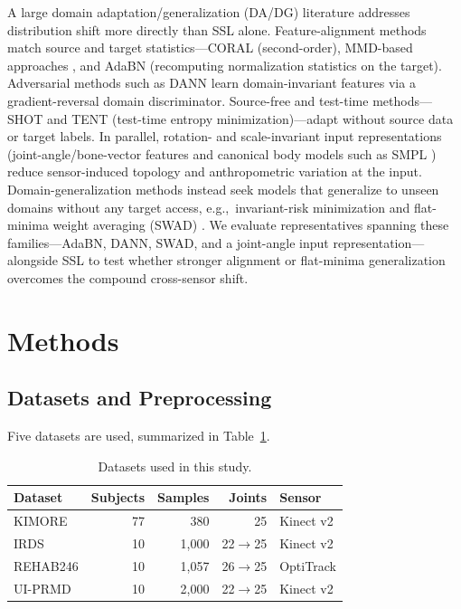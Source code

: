 \documentclass[10pt,journal]{IEEEtran}
\begin{document}
A large domain adaptation/generalization (DA/DG) literature addresses distribution shift more directly than SSL alone. Feature-alignment methods match source and target statistics---CORAL \cite{sun2016deep} (second-order), MMD-based approaches \cite{long2015dan}, and AdaBN \cite{li2018adabn} (recomputing normalization statistics on the target). Adversarial methods such as DANN \cite{ganin2016dann} learn domain-invariant features via a gradient-reversal domain discriminator. Source-free and test-time methods---SHOT \cite{liang2020shot} and TENT \cite{wang2021tent} (test-time entropy minimization)---adapt without source data or target labels. In parallel, rotation- and scale-invariant input representations (joint-angle/bone-vector features and canonical body models such as SMPL \cite{loper2015smpl}) reduce sensor-induced topology and anthropometric variation at the input. Domain-generalization methods instead seek models that generalize to unseen domains without any target access, e.g.,\ invariant-risk minimization \cite{arjovsky2019irm} and flat-minima weight averaging (SWAD) \cite{cha2021swad}. We evaluate representatives spanning these families---AdaBN, DANN, SWAD, and a joint-angle input representation---alongside SSL to test whether stronger alignment or flat-minima generalization overcomes the compound cross-sensor shift.

\section{Methods}
\label{sec:methods}

\subsection{Datasets and Preprocessing}
\label{sec:datasets}

Five datasets are used, summarized in Table~\ref{tab:datasets}.

\begin{table}[t]
\centering
\caption{Datasets used in this study.}
\label{tab:datasets}
\begin{tabular}{lrrrl}
\toprule
Dataset & Subjects & Samples & Joints & Sensor \\
\midrule
KIMORE & 77 & 380 & 25 & Kinect v2 \\
IRDS & 10 & 1,000 & 22$\to$25 & Kinect v2 \\
REHAB246 & 10 & 1,057 & 26$\to$25 & OptiTrack \\
UI-PRMD & 10 & 2,000 & 22$\to$25 & Kinect v2 \\
\bottomrule
\end{tabular}
\end{table}
\end{document}
